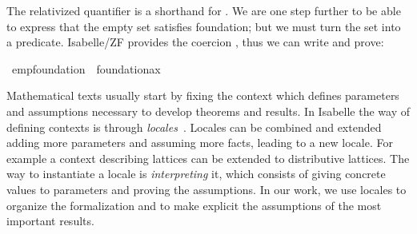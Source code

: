 \noindent The relativized quantifier
 is a shorthand for \isa{{\isasymforall}x{\isachardot}\ M(x)
  {\isasymlongrightarrow} P(x)}. We are one step further to be able to
express that the empty set satisfies foundation; but we must turn the
set \isa{0 :: i} into a predicate. Isabelle/ZF provides the coercion
, thus we can write and prove:
\begin{isabelle}
\isamarkupfalse%
\ emp{\isacharunderscore}foundation\ {\isacharcolon}\ {\isachardoublequoteopen}foundation{\isacharunderscore}ax{\isacharparenleft}{\isacharhash}{\isacharhash}{}{\isacharparenright}{\isachardoublequoteclose}
\end{isabelle}




Mathematical texts usually start by fixing the context which defines
parameters and assumptions necessary to develop theorems
and results. In Isabelle the way of defining contexts is through
\emph{locales}~\cite{ballarin2010tutorial}.
Locales can be combined and extended adding more parameters and assuming
more facts, leading to a new locale. For example a context describing
lattices can be extended to distributive lattices.
The way to instantiate a locale is \emph{interpreting} it, which consists
of giving concrete values to parameters and proving the assumptions.
In our work, we use locales to organize the formalization and to make
explicit the assumptions of the most important results.



